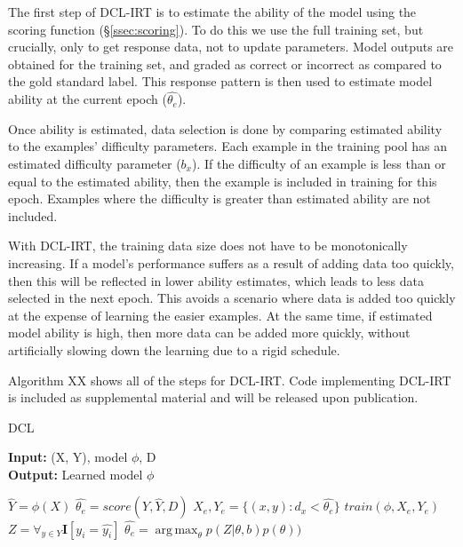 \documentclass[letterpaper]{article} %
\begin{document}
The first step of DCL-IRT is to estimate the ability of the model using the scoring function (\S \ref{ssec:scoring}). 
To do this we use the full training set, but crucially, only to get response data, not to update parameters. 
Model outputs are obtained for the training set, and graded as correct or incorrect as compared to the gold standard label. 
This response pattern is then used to estimate model ability at the current epoch ($\hat{\theta_e}$).

Once ability is estimated, data selection is done by comparing estimated ability to the examples' difficulty parameters.
Each example in the training pool has an estimated difficulty parameter ($b_x$).
If the difficulty of an example is less than or equal to the estimated ability, then the example is included in training for this epoch.
Examples where the difficulty is greater than estimated ability are not included.

With DCL-IRT, the training data size does not have to be monotonically increasing. If a model's performance suffers as a result of adding data too quickly, then this will be reflected in lower ability estimates, which leads to less data selected in the next epoch. 
This avoids a scenario where data is added too quickly at the expense of learning the easier examples.
At the same time, if estimated model ability is high, then more data can be added more quickly, without artificially slowing down the learning due to a rigid schedule.

Algorithm XX shows all of the steps for DCL-IRT. Code implementing DCL-IRT is included as supplemental material and will be released upon publication. 

\begin{algorithm}
	\caption{DCL}
	\hspace*{\algorithmicindent}\textbf{Input:} (X, Y), model $\phi$, D \\
	\hspace*{\algorithmicindent}\textbf{Output:} Learned model $\phi$ 
	\begin{algorithmic}[1]
			\State $\hat{Y} = \phi(X)$
			\State $\hat{\theta_e} = score(Y, \hat{Y}, D)$
			\State $X_e, Y_e = \{(x,y): d_x < \hat{\theta_e}\}$
			\State $train(\phi, X_e, Y_e)$
		\EndWhile 
			\State $Z = \forall_{y \in Y} \mathbf{I}[y_i = \hat{y_i}]$
			\State $\hat{\theta_e} = \operatorname*{arg\,max}_\theta p(Z \vert \theta, b)p(\theta))$
		\EndProcedure 
	\end{algorithmic} 
\end{algorithm} 
\end{document}
